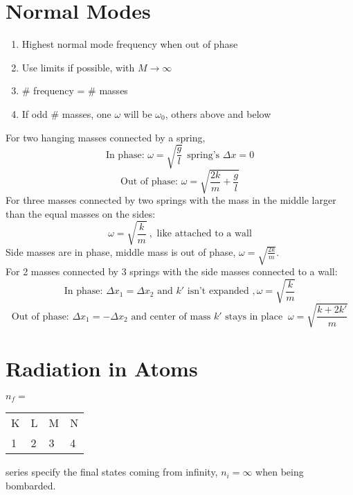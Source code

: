 \documentclass[10pt,a4paper]{article}
\begin{document}
\section{Normal Modes} %
\label{sec:normal_modes}
\begin{enumerate}
    \item Highest normal mode frequency when out of phase
    \item Use limits if possible, with $M \rightarrow \infty$
    \item \# frequency = \# masses
    \item If odd \# masses, one $\omega$ will be $\omega_0$, others above and below
\end{enumerate}
For two hanging masses connected by a spring, 
\begin{equation}
    \textrm{In phase: }\omega = \sqrt{\frac{g}{l}}~~ \textrm{spring's }\Delta x = 0
\end{equation}
\begin{equation}
    \textrm{Out of phase: } \omega = \sqrt{ \frac{2k}{m} + \frac{g}{l}}
\end{equation}
For three masses connected by two springs with the mass in the middle larger than the equal masses on the sides:
\begin{equation}
    \omega = \sqrt{ \frac{k}{m}}~, \textrm{ like attached to a wall}
\end{equation}
Side masses are in phase, middle mass is out of phase, $\omega = \sqrt{\frac{2k}{m}}$.\\

For 2 masses connected by 3 springs with the side masses connected to a wall:
\begin{equation}
    \textrm{In phase: } \Delta x_1 = \Delta x_2 \textrm{ and }k' \textrm{ isn't expanded }, \omega = \sqrt{\frac{k}{m}}
\end{equation}
\begin{equation}
    \textrm{Out of phase: } \Delta x_1 = -\Delta x_2 \textrm{ and center of mass } k' \textrm{ stays in place }~ \omega = \sqrt{\frac{k + 2k'}{m}}
\end{equation}

\section{Radiation in Atoms} %
\label{sec:radiation_in_atoms}
$n_f=$\begin{tabular}{l l l l}
K & L & M & N\\
1 & 2 & 3 & 4
\end{tabular}
series specify the final states coming from infinity, $n_i = \infty$ when being bombarded. 
\end{document}
